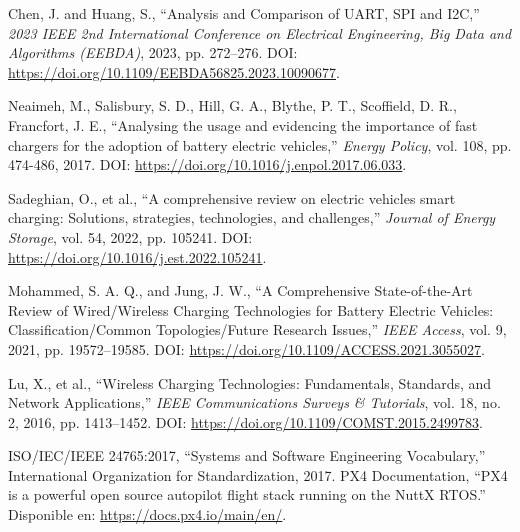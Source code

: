 \begin{thebibliography}{30}
    Chen, J. and Huang, S., ``Analysis and Comparison of UART, SPI and I2C,'' \textit{2023 IEEE 2nd International Conference on Electrical Engineering, Big Data and Algorithms (EEBDA)}, 2023, pp. 272--276. DOI: \url{https://doi.org/10.1109/EEBDA56825.2023.10090677}.

    Neaimeh, M., Salisbury, S. D., Hill, G. A., Blythe, P. T., Scoffield, D. R., Francfort, J. E., ``Analysing the usage and evidencing the importance of fast chargers for the adoption of battery electric vehicles,'' \textit{Energy Policy}, vol. 108, pp. 474-486, 2017. DOI: \url{https://doi.org/10.1016/j.enpol.2017.06.033}.

    Sadeghian, O., et al., ``A comprehensive review on electric vehicles smart charging: Solutions, strategies, technologies, and challenges,'' \textit{Journal of Energy Storage}, vol. 54, 2022, pp. 105241. DOI: \url{https://doi.org/10.1016/j.est.2022.105241}.

    Mohammed, S. A. Q., and Jung, J. W., ``A Comprehensive State-of-the-Art Review of Wired/Wireless Charging Technologies for Battery Electric Vehicles: Classification/Common Topologies/Future Research Issues,'' \textit{IEEE Access}, vol. 9, 2021, pp. 19572--19585. DOI: \url{https://doi.org/10.1109/ACCESS.2021.3055027}.

    Lu, X., et al., ``Wireless Charging Technologies: Fundamentals, Standards, and Network Applications,'' \textit{IEEE Communications Surveys \& Tutorials}, vol. 18, no. 2, 2016, pp. 1413--1452. DOI: \url{https://doi.org/10.1109/COMST.2015.2499783}.



     ISO/IEC/IEEE 24765:2017, ``Systems and Software Engineering Vocabulary,'' International Organization for Standardization, 2017.
     PX4 Documentation, ``PX4 is a powerful open source autopilot flight stack running on the NuttX RTOS.'' Disponible en: \url{https://docs.px4.io/main/en/}.


\end{thebibliography}
